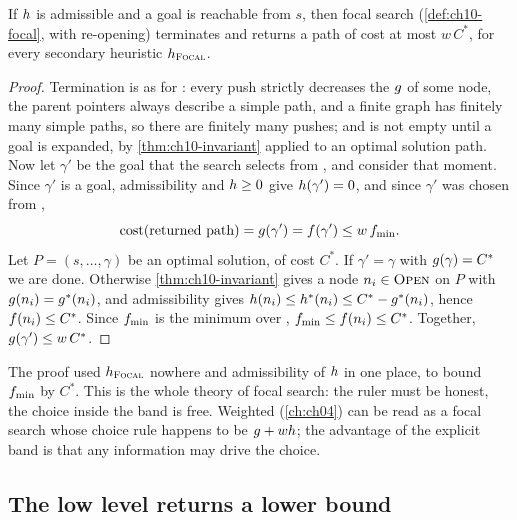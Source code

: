\begin{theorem}
\label{thm:ch10-focal}
If $h$ is admissible and a goal is reachable from $s$, then focal search
(\cref{def:ch10-focal}, with re-opening) terminates and returns a path of cost
at most $w\,C^*$, for every secondary heuristic $h_{\textsc{Focal}}$.
\end{theorem}
\begin{proof}
Termination is as for \astar: every push strictly decreases the $g$ of
some node, the parent pointers always describe a simple path, and a finite
graph has finitely many simple paths, so there are finitely many pushes; and
\Open is not empty until a goal is expanded, by \cref{thm:ch10-invariant}
applied to an optimal solution path. Now let $\gamma'$ be the goal that the search selects from \Focal, and
consider that moment. Since
$\gamma'$ is a goal, admissibility and $h \ge 0$ give
$h(\gamma') = 0$, and since $\gamma'$ was chosen from \Focal,
\[
  \operatorname{cost}(\text{returned path}) = g(\gamma') = f(\gamma') \le
  w\,f_{\min}.
\]
Let $P = (s, \dots, \gamma)$ be an optimal solution, of cost $C^*$. If
$\gamma' = \gamma$ with $g(\gamma) = C^*$ we are done. Otherwise
\cref{thm:ch10-invariant} gives a node $n_i \in \textsc{Open}$ on $P$ with
$g(n_i) = g^*(n_i)$, and admissibility gives $h(n_i) \le
h^*(n_i) \le C^* - g^*(n_i)$, hence $f(n_i) \le C^*$. Since
$f_{\min}$ is the minimum over \Open, $f_{\min} \le f(n_i)
\le C^*$. Together, $g(\gamma') \le w\,C^*$.
\end{proof}

The proof used $h_{\textsc{Focal}}$ nowhere and admissibility of $h$ in
one place, to bound $f_{\min}$ by $C^*$. This is the whole theory of
focal search: the ruler must be honest, the choice inside the band is free.
Weighted \astar (\cref{ch:ch04}) can be read as a focal search whose choice
rule happens to be $g + wh$; the advantage of the explicit band is
that any information may drive the choice.

\subsection{The low level returns a lower bound}

